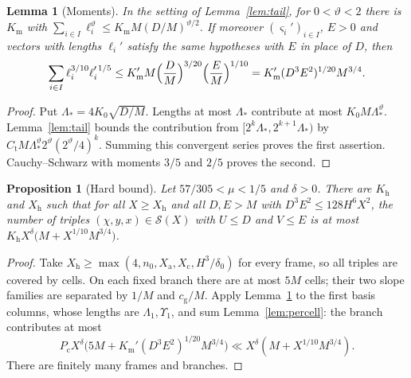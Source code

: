 \documentclass[11pt,reqno]{amsart}
\newtheorem{proposition}[theorem]{Proposition}
\newtheorem{lemma}[theorem]{Lemma}
\theoremstyle{definition}
\theoremstyle{remark}
\numberwithin{equation}{section}
\begin{document}
\begin{lemma}[Moments]\label{lem:moments}
In the setting of Lemma~\ref{lem:tail}, for $0<\vartheta<2$ there is $K_{\mathrm m}$
with $\sum_{i\in I}\ell_i^{\vartheta}\le K_{\mathrm m}M(D/M)^{\vartheta/2}$. If moreover
$(\varsigma_i')_{i\in I}$, $E>0$ and vectors with lengths $\ell_i'$ satisfy the same
hypotheses with $E$ in place of $D$, then
\[
 \sum_{i\in I}\ell_i^{3/10}\ell_i'^{\,1/5}\le
 K_{\mathrm m}'M\Bigl(\frac DM\Bigr)^{3/20}\Bigl(\frac EM\Bigr)^{1/10}
 =K_{\mathrm m}'(D^3E^2)^{1/20}M^{3/4}.
\]
\end{lemma}
\begin{proof}
Put $\Lambda_*=4K_0\sqrt{D/M}$. Lengths at most $\Lambda_*$
contribute at most $K_0M\Lambda_*^\vartheta$.
Lemma~\ref{lem:tail} bounds the contribution from
$[2^k\Lambda_*,2^{k+1}\Lambda_*)$ by
$C_{\mathrm t}M\Lambda_*^\vartheta2^\vartheta(2^\vartheta/4)^k$.
Summing this convergent series proves the first assertion.
Cauchy--Schwarz with moments $3/5$ and $2/5$ proves the second.
\end{proof}

\begin{proposition}[Hard bound]\label{prop:hard}
Let $57/305<\mu<1/5$ and $\delta>0$. There
are $K_{\mathrm h}$ and $X_{\mathrm h}$ such that for all
$X\ge X_{\mathrm h}$ and all $D,E>M$ with $D^3E^2\le128H^6X^2$, the number
of triples $(\chi,y,x)\in\mathcal S(X)$ with $U\le D$ and $V\le E$ is at
most $K_{\mathrm h}X^{\delta}\bigl(M+X^{1/10}M^{3/4}\bigr)$.
\end{proposition}
\begin{proof}
Take $X_{\mathrm h}\ge\max(4,n_0,X_{\mathrm a},X_{\mathrm c},H^3/\delta_0)$
for every frame, so all triples are covered by cells.
On each fixed branch there are at most $5M$ cells; their two slope
families are separated by $1/M$ and $c_{\mathrm g}/M$.
Apply Lemma~\ref{lem:moments} to the first basis columns, whose
lengths are $\Lambda_1,\Upsilon_1$, and sum Lemma~\ref{lem:percell}:
the branch contributes at most
\[
 P_{\mathrm c}X^\delta
 \bigl(5M+K_{\mathrm m}'(D^3E^2)^{1/20}M^{3/4}\bigr)
 \ll X^\delta(M+X^{1/10}M^{3/4}).
\]
There are finitely many frames and branches.
\end{proof}
\end{document}
